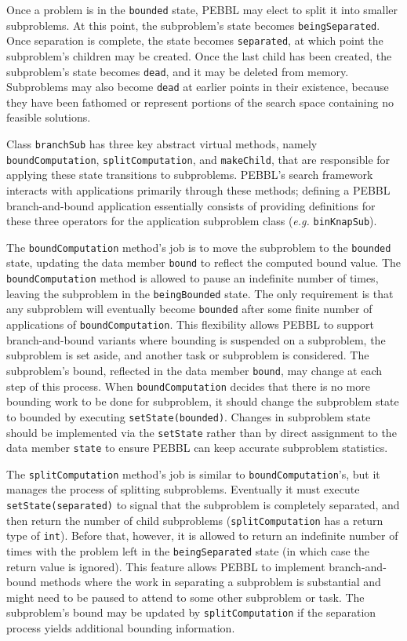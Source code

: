Once a problem is in the \texttt{bounded} state, PEBBL may elect to
split it into smaller subproblems.  At this point, the subproblem's
state becomes \texttt{beingSeparated}.  Once separation is complete,
the state becomes \texttt{separated}, at which point the subproblem's
children may be created.  Once the last child has been created, the
subproblem's state becomes \texttt{dead}, and it may be deleted from
memory.  Subproblems may also become \texttt{dead} at earlier points
in their existence, because they have been fathomed or represent
portions of the search space containing no feasible solutions.

Class \texttt{branchSub} has three key abstract virtual methods,
namely \texttt{boundComputation}, \texttt{splitComputation}, and
\texttt{makeChild}, that are responsible for applying these state
transitions to subproblems.  PEBBL's search framework interacts with
applications primarily through these methods; defining a PEBBL
branch-and-bound application essentially consists of providing
definitions for these three operators for the application subproblem
class ({\em e.g.} \texttt{binKnapSub}).

The \texttt{boundComputation} method's job is to move the subproblem
to the \texttt{bounded} state, updating the data member \texttt{bound}
to reflect the computed bound value.  The \texttt{boundComputation} method
is allowed to pause an indefinite number of times, leaving the
subproblem in the \texttt{beingBounded} state.  The only requirement
is that any subproblem will eventually become \texttt{bounded} after
some finite number of applications of \texttt{boundComputation}.  This
flexibility allows PEBBL to support branch-and-bound variants where 
bounding is suspended on a subproblem, the subproblem is set aside, and another
task or subproblem is considered.  The
subproblem's bound, reflected in the data member \texttt{bound}, may
change at each step of this process.  When \texttt{boundComputation}
decides that there is no more bounding work to be done for subproblem,
it should change the subproblem state to bounded by executing
\texttt{setState(bounded)}.  Changes in subproblem state should be
implemented via the \texttt{setState} rather than by direct assignment
to the data member \texttt{state} to ensure PEBBL can keep accurate
subproblem statistics.

The \texttt{splitComputation} method's job is similar to
\texttt{boundComputation}'s, but it manages the process of splitting
subproblems.  Eventually it must execute \texttt{setState(separated)}
to signal that the subproblem is completely separated, and then return
the number of child subproblems (\texttt{splitComputation} has a
return type of \texttt{int}).  Before that, however, it is allowed to
return an indefinite number of times with the problem left in the
\texttt{beingSeparated} state (in which case the return value is
ignored).  
This feature allows PEBBL to implement
branch-and-bound methods where the work in separating a subproblem is
substantial and might need to be paused to attend to some other
subproblem or task.  The subproblem's bound may be updated by
\texttt{splitComputation} if the separation process yields additional
bounding information.

